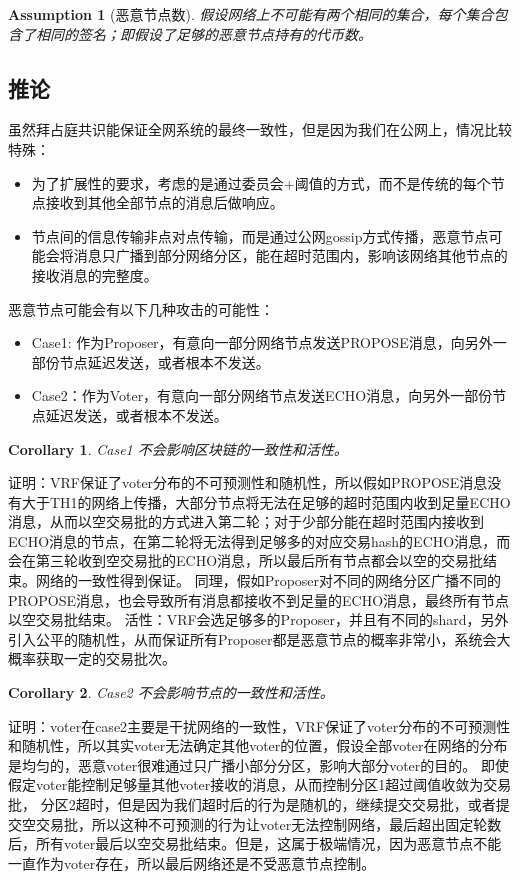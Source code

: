 \documentclass[12pt, UTF8]{article}
\newtheorem{corollary}{Corollary}[theorem]
\newtheorem{assumption}[theorem]{Assumption}
\begin{document}
\begin{assumption}[恶意节点数]
假设网络上不可能有两个相同的集合，每个集合包含了相同的签名；即假设了足够的恶意节点持有的代币数。
\end{assumption}

\subsection{推论}
虽然拜占庭共识能保证全网系统的最终一致性，但是因为我们在公网上，情况比较特殊：
\begin{itemize}
\item 为了扩展性的要求，考虑的是通过委员会+阈值的方式，而不是传统的每个节点接收到其他全部节点的消息后做响应。
\item	节点间的信息传输非点对点传输，而是通过公网gossip方式传播，恶意节点可能会将消息只广播到部分网络分区，能在超时范围内，影响该网络其他节点的接收消息的完整度。
\end{itemize}
恶意节点可能会有以下几种攻击的可能性：
\begin{itemize}
\item Case1: 作为Proposer，有意向一部分网络节点发送PROPOSE消息，向另外一部份节点延迟发送，或者根本不发送。
\item Case2：作为Voter，有意向一部分网络节点发送ECHO消息，向另外一部份节点延迟发送，或者根本不发送。
\end{itemize}

\begin{corollary}
Case1 不会影响区块链的一致性和活性。
\end{corollary}
证明：VRF保证了voter分布的不可预测性和随机性，所以假如PROPOSE消息没有大于TH1的网络上传播，大部分节点将无法在足够的超时范围内收到足量ECHO消息，从而以空交易批的方式进入第二轮；对于少部分能在超时范围内接收到ECHO消息的节点，在第二轮将无法得到足够多的对应交易hash的ECHO消息，而会在第三轮收到空交易批的ECHO消息，所以最后所有节点都会以空的交易批结束。网络的一致性得到保证。
同理，假如Proposer对不同的网络分区广播不同的PROPOSE消息，也会导致所有消息都接收不到足量的ECHO消息，最终所有节点以空交易批结束。
活性：VRF会选足够多的Proposer，并且有不同的shard，另外引入公平的随机性，从而保证所有Proposer都是恶意节点的概率非常小，系统会大概率获取一定的交易批次。

\begin{corollary}
Case2 不会影响节点的一致性和活性。
\end{corollary}
证明：voter在case2主要是干扰网络的一致性，VRF保证了voter分布的不可预测性和随机性，所以其实voter无法确定其他voter的位置，假设全部voter在网络的分布是均匀的，恶意voter很难通过只广播小部分分区，影响大部分voter的目的。
即使假定voter能控制足够量其他voter接收的消息，从而控制分区1超过阈值收敛为交易批，
分区2超时，但是因为我们超时后的行为是随机的，继续提交交易批，或者提交空交易批，所以这种不可预测的行为让voter无法控制网络，最后超出固定轮数后，所有voter最后以空交易批结束。但是，这属于极端情况，因为恶意节点不能一直作为voter存在，所以最后网络还是不受恶意节点控制。
\end{document}
